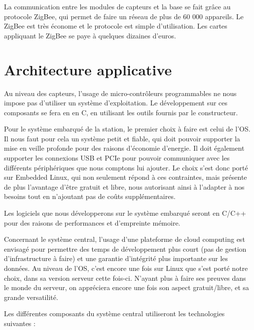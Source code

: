 La communication entre les modules de capteurs et la base se fait grâce au protocole ZigBee, qui permet de faire un réseau de plus de 60 000 appareils. Le ZigBee est très économe et le protocole est simple d’utilisation. Les cartes appliquant le ZigBee se paye à quelques dizaines d’euros. 




\section{Architecture applicative}

Au niveau des capteurs, l'usage de micro-contrôleurs programmables ne nous impose pas d'utiliser un système d'exploitation. Le développement sur ces composants se fera en en C, en utilisant les outils fournis par le constructeur.

Pour le système embarqué de la station, le premier choix à faire est celui de l'OS. Il nous faut pour cela un système petit et fiable, qui doit pouvoir supporter la mise en veille profonde pour des raisons d'économie d'energie. Il doit également supporter les connexions USB et PCIe pour pouvoir communiquer avec les différents périphériques que nous comptons lui ajouter. Le choix s'est donc porté sur Embedded Linux, qui non seulement répond à ces contraintes, mais présente de plus l'avantage d'être gratuit et libre, nous autorisant ainsi à l'adapter à nos besoins tout en n'ajoutant pas de coûts supplémentaires.

Les logiciels que nous développerons sur le système embarqué seront en C/C++ pour des raisons de performances et d'empreinte mémoire.

Concernant le système central, l'usage d'une plateforme de cloud computing est envisagé pour permettre des temps de développement plus court (pas de gestion d'infrastructure à faire) et une garantie d'intégrité plus importante sur les données. Au niveau de l'OS, c'est encore une fois sur Linux que s'est porté notre choix, dans sa version serveur cette fois-ci. N'ayant plus à faire ses preuves dans le monde du serveur, on appréciera encore une fois son aspect gratuit/libre, et sa grande versatilité.

Les différentes composants du système central utiliseront les technologies suivantes :

